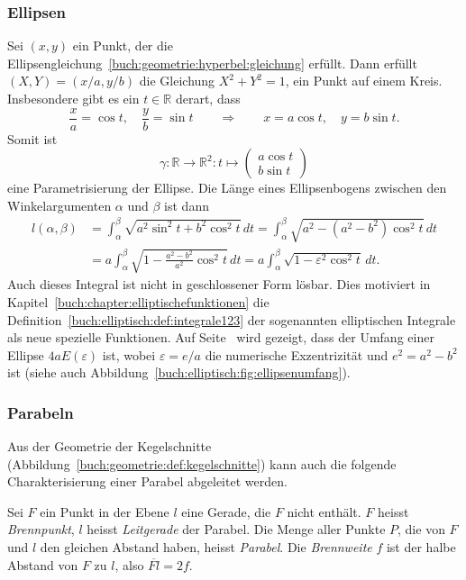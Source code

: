 %
%
\subsubsection{Ellipsen}
Sei $(x,y)$ ein Punkt, der die
Ellipsengleichung~\eqref{buch:geometrie:hyperbel:gleichung} erfüllt.
Dann erfüllt $(X,Y)=(x/a, y/b)$ die Gleichung $X^2+Y^2=1$, ein Punkt auf
einem Kreis.
Insbesondere gibt es ein $t\in\mathbb{R}$ derart, dass
\[
\frac{x}{a} = \cos t ,\quad \frac{y}{b}=\sin t
\qquad\Rightarrow\qquad
x=a\cos t,\quad y=b\sin t.
\]
Somit ist
\[
\gamma
\colon
\mathbb{R}\to\mathbb{R}^2
:
t \mapsto\begin{pmatrix}a\cos t\\b\sin t\end{pmatrix}
\]
eine Parametrisierung der Ellipse.
Die Länge eines Ellipsenbogens zwischen den Winkelargumenten $\alpha$ und
$\beta$ ist dann
\begin{align*}
l(\alpha,\beta)
&=
\int_\alpha^\beta
\sqrt{
a^2 \sin^2 t + b^2 \cos^2t
}
\,dt
=
\int_\alpha^\beta
\sqrt{
a^2 - (a^2-b^2)\cos^2 t
}
\,dt
\\
&=
a
\int_\alpha^\beta
\sqrt{
1 - \frac{a^2-b^2}{a^2} \cos^2t
}
\,dt
=
a\int_\alpha^\beta
\sqrt{
1-\varepsilon^2 \cos^2t
}
\,dt.
\end{align*}
Auch dieses Integral ist nicht in geschlossener Form lösbar.
Dies motiviert in Kapitel~\ref{buch:chapter:elliptischefunktionen}
die Definition~\ref{buch:elliptisch:def:integrale123}
der sogenannten elliptischen Integrale als neue
spezielle Funktionen.
Auf Seite~\pageref{buch:elliptisch:fig:ellipsenumfang} wird gezeigt,
dass der Umfang einer Ellipse $4aE(\varepsilon)$ ist,
wobei $\varepsilon=e/a$ die numerische Exzentrizität
und $e^2=a^2-b^2$ ist (siehe auch
Abbildung~\ref{buch:elliptisch:fig:ellipsenumfang}).

%
%
\subsubsection{Parabeln}
Aus der Geometrie der Kegelschnitte
(Abbildung~\ref{buch:geometrie:def:kegelschnitte})
kann auch die folgende Charakterisierung einer Parabel abgeleitet werden.

\begin{definition}
\label{buch:geometrie:def:parabel}
Sei $F$ ein Punkt in der Ebene $l$ eine Gerade, die $F$ nicht enthält.
$F$ heisst {\em Brennpunkt}, $l$ heisst {\em Leitgerade} der Parabel.
Die Menge aller Punkte $P$, die von $F$ und $l$ den gleichen
Abstand haben, heisst {\em Parabel}.
Die {\em Brennweite} $f$ ist der halbe Abstand von $F$ zu $l$,
also $\overline{Fl}=2f$.
\end{definition}

